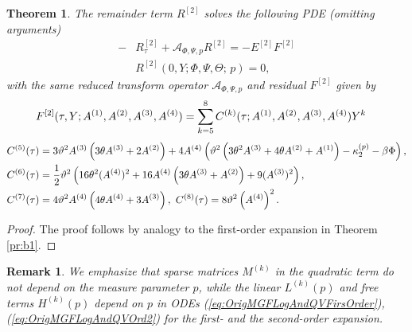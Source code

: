 \documentclass[11pt,a4paper] {article}
\newtheorem{theorem}{Theorem}[section]
\newtheorem*{remark}{Remark}%
\begin{document}
\begin{theorem}
The remainder term $R^{[2]}$ solves the following PDE (omitting arguments)
\begin{equation}\label{eq:OrigMGFLogAndQVOrd2Rem1}
\begin{split}
 -&R^{[2]}_\tau +  \mathcal A_{\Phi,\Psi,p} R^{[2]}=-E^{[2]}F^{[2]}\\
&R^{[2]}(0,Y; \Phi,\Psi,\Theta;\,p)=0,
\end{split}
\end{equation}
with the same reduced transform operator $\mathcal A_{\Phi,\Psi,p}$ and residual $F^{[2]}$ given by
\begin{equation}\label{eq:OrigMGFLogAndQVOrd2Rem2Coeffs}
\begin{split}
&F^{[2]}(\tau,Y;A^{(1)},A^{(2)},A^{(3)},A^{(4)})=\sum_{k=5}^8 C^{(k)}(\tau;A^{(1)},A^{(2)},A^{(3)},A^{(4)})Y^k\vspace*{-1\baselineskip}
\end{split}
\end{equation}\vspace*{-1\baselineskip}
\begin{equation*}
\begin{split}
C^{(5)}(\tau) &=3 \vartheta ^2 A^{(3)} \left(3 \theta A^{(3)}+2 A^{(2)}\right)+4 A^{(4)} \left(\vartheta ^2 \left(3\theta^2 A^{(3)}+4 \theta A^{(2)}+A^{(1)}\right)-\kappa_2^{(p)}-\beta\Phi\right) ,\\
C^{(6)}(\tau) &=\frac{1}{2} \vartheta ^2 \left(16 \theta^2 (A^{(4)})^2+16 A^{(4)} \left(3 \theta A^{(3)}+A^{(2)}\right)+9 (A^{(3)})^2\right) ,\\
C^{(7)}(\tau) &=4 \vartheta ^2 A^{(4)} \left(4 \theta A^{(4)}+3 A^{(3)}\right),\ C^{(8)}(\tau) = 8 \vartheta ^2 \left(A^{(4)}\right)^2.\vspace*{-1\baselineskip} 
\end{split}
\end{equation*}
\end{theorem}
\begin{proof}
The proof follows by analogy to the first-order expansion in Theorem \ref{pr:b1}.
\end{proof}

\begin{remark}
We emphasize that sparse matrices $M^{(k)}$ in the quadratic term  do not depend on the measure parameter $p$, while the linear $L^{(k)}(p)$ and free terms $H^{(k)}(p)$ depend on $p$ in ODEs (\ref{eq:OrigMGFLogAndQVFirsOrder}), (\ref{eq:OrigMGFLogAndQVOrd2}) for the first- and the second-order expansion.
\end{remark}
\end{document}
